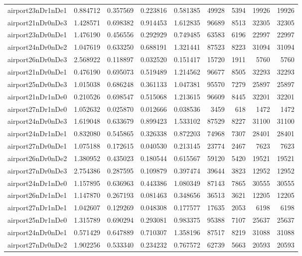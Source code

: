 \begin{longtable}{|l|r|r|r|r|r|r|r|r|}
airport23nDr1nDe1 & 0.884712 & 0.357569 & 0.223816 & 0.581385 & 49928 & 5394 & 19926 & 19926 \\
airport21nDr0nDe3 & 1.428571 & 0.698382 & 0.914453 & 1.612835 & 96689 & 8513 & 32305 & 32305 \\
airport23nDr0nDe1 & 1.476190 & 0.456556 & 0.292929 & 0.749485 & 63583 & 6196 & 22997 & 22997 \\
airport24nDr0nDe2 & 1.047619 & 0.633250 & 0.688191 & 1.321441 & 87523 & 8223 & 31094 & 31094 \\
airport26nDr0nDe3 & 2.568922 & 0.118897 & 0.032520 & 0.151417 & 15720 & 1911 & 5760 & 5760 \\
airport21nDr0nDe1 & 0.476190 & 0.695073 & 0.519489 & 1.214562 & 96677 & 8505 & 32293 & 32293 \\
airport25nDr0nDe3 & 1.015038 & 0.686248 & 0.361133 & 1.047381 & 95570 & 7279 & 25897 & 25897 \\
airport21nDr1nDe0 & 0.210526 & 0.698547 & 0.515068 & 1.213615 & 96609 & 8445 & 32201 & 32201 \\
airport27nDr1nDe0 & 1.052632 & 0.025870 & 0.012666 & 0.038536 & 3459 & 618 & 1472 & 1472 \\
airport24nDr0nDe3 & 1.619048 & 0.633679 & 0.899423 & 1.533102 & 87529 & 8227 & 31100 & 31100 \\
airport24nDr1nDe1 & 0.832080 & 0.545865 & 0.326338 & 0.872203 & 74968 & 7307 & 28401 & 28401 \\
airport27nDr0nDe1 & 1.075188 & 0.172615 & 0.040530 & 0.213145 & 23774 & 2467 & 7623 & 7623 \\
airport26nDr0nDe2 & 1.380952 & 0.435023 & 0.180544 & 0.615567 & 59120 & 5420 & 19521 & 19521 \\
airport27nDr0nDe3 & 2.754386 & 0.287595 & 0.109879 & 0.397474 & 39644 & 3823 & 12952 & 12952 \\
airport24nDr1nDe0 & 1.157895 & 0.636963 & 0.443386 & 1.080349 & 87143 & 7865 & 30555 & 30555 \\
airport26nDr1nDe1 & 1.147870 & 0.267193 & 0.081463 & 0.348656 & 36513 & 3621 & 12205 & 12205 \\
airport27nDr1nDe1 & 1.042607 & 0.129269 & 0.048308 & 0.177577 & 17635 & 2053 & 6198 & 6198 \\
airport25nDr1nDe0 & 1.315789 & 0.690294 & 0.293081 & 0.983375 & 95388 & 7107 & 25637 & 25637 \\
airport24nDr0nDe1 & 0.571429 & 0.647889 & 0.710307 & 1.358196 & 87517 & 8219 & 31088 & 31088 \\
airport27nDr0nDe2 & 1.902256 & 0.533340 & 0.234232 & 0.767572 & 62739 & 5663 & 20593 & 20593 \\

\end{longtable}
